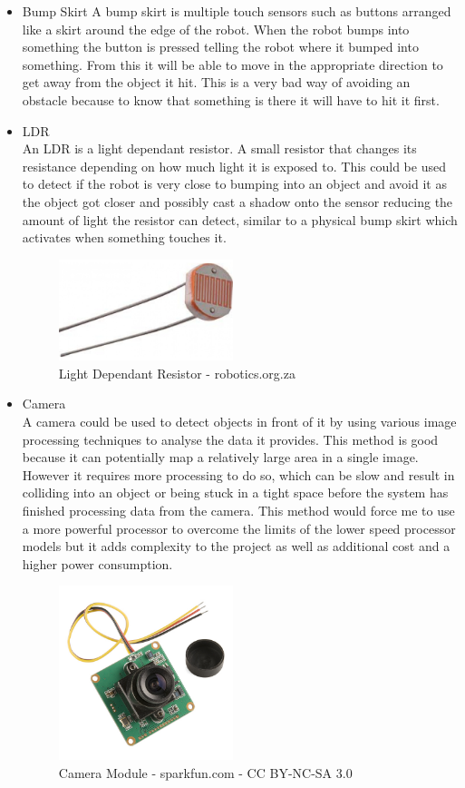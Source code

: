 \begin{itemize}
\item Bump Skirt
A bump skirt is multiple touch sensors such as buttons arranged like a skirt around the edge of the robot.  When the robot bumps into something the button is pressed telling the robot where it bumped into something.  From this it will be able to move in the appropriate direction to get away from the object it hit.  This is a very bad way of avoiding an obstacle because to know that something is there it will have to hit it first.

\item LDR
\\An LDR is a light dependant resistor.  A small resistor that changes its resistance depending on how much light it is exposed to.  This could be used to detect if the robot is very close to bumping into an object and avoid it as the object got closer and possibly cast a shadow onto the sensor reducing the amount of light the resistor can detect, similar to a physical bump skirt which activates when something touches it.
\begin{figure}[h]
\centering
        \includegraphics[width=2.0in] {Images/ldr.jpg}
        \caption{Light Dependant Resistor - robotics.org.za}
        \label{Light Dependant Resistor}
\end{figure}

\item Camera
\\A camera could be used to detect objects in front of it by using various image processing techniques to analyse the data it provides.  This method is good because it can potentially map a relatively large area in a single image.  However it requires more processing to do so, which can be slow and result in colliding into an object or being stuck in a tight space before the system has finished processing data from the camera.  This method would force me to use a more powerful processor to overcome the limits of the lower speed processor models but it adds complexity to the project as well as additional cost and a higher power consumption.
\begin{figure}[h]
\centering
        \includegraphics[width=2.0in] {Images/camera.jpg}
        \caption{Camera Module - sparkfun.com - CC BY-NC-SA 3.0}
        \label{Camera Module}
\end{figure}


\end{itemize}
